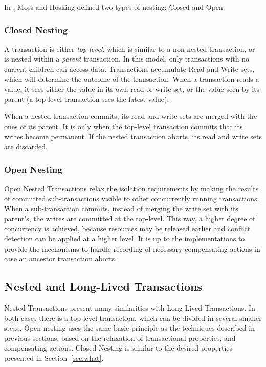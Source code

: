 In \cite{moss2006nested}, Moss and Hosking defined two types of
nesting: Closed and Open.

\subsubsection{Closed Nesting}

A transaction is either {\it top-level}, which is similar to a
non-nested transaction, or is nested within a {\it parent}
transaction. In this model, only transactions with no current children
can access data. Transactions accumulate Read and Write sets, which
will determine the outcome of the transaction. When a transaction
reads a value, it sees either the value in its own read or write set,
or the value seen by its parent (a top-level transaction sees the
latest value).

When a nested transaction commits, its read and write sets are merged
with the ones of its parent. It is only when the top-level transaction
commits that its writes become permanent. If the nested transaction
aborts, its read and write sets are discarded.

\subsubsection{Open Nesting}

Open Nested Transactions relax the isolation requirements by making
the results of committed sub-transactions visible to other
concurrently running transactions. When a sub-transaction commits,
instead of merging the write set with its parent's, the writes are
committed at the top-level. This way, a higher degree of concurrency
is achieved, because resources may be released earlier and conflict
detection can be applied at a higher level. It is up to the
implementations to provide the mechanisms to handle recording of
necessary compensating actions in case an ancestor transaction aborts.

\subsection{Nested and Long-Lived Transactions}

Nested Transactions present many similarities with Long-Lived
Transactions. In both cases there is a top-level transaction, which
can be divided in several smaller steps. Open nesting uses the same
basic principle as the techniques described in previous sections,
based on the relaxation of transactional properties, and compensating
actions. Closed Nesting is similar to the desired properties presented
in Section~\ref{sec:what}.

